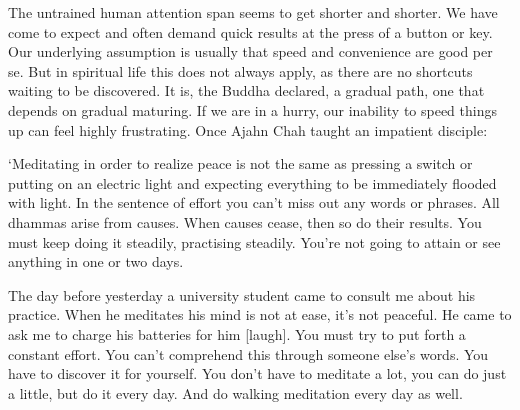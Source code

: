 The untrained human attention span seems to get shorter and shorter. We
have come to expect and often demand quick results at the press of a
button or key. Our underlying assumption is usually that speed and
convenience are good per se. But in spiritual life this does not always
apply, as there are no shortcuts waiting to be discovered. It is, the
Buddha declared, a gradual path, one that depends on gradual maturing. 
If we are in a hurry, our inability to speed things up can feel highly
frustrating. Once Ajahn Chah taught an impatient disciple: 

`Meditating in order to realize peace is not the same as pressing a
switch or putting on an electric light and expecting everything to be
immediately flooded with light. In the sentence of effort you can't miss
out any words or phrases. All dhammas arise from causes. When causes
cease, then so do their results. You must keep doing it steadily, 
practising steadily. You're not going to attain or see anything in one
or two days.

The day before yesterday a university student came to
consult me about his practice. When he meditates his mind is not at
ease, it's not peaceful. He came to ask me to charge his batteries for
him [laugh]. You must try to put forth a constant effort. You can't
comprehend this through someone else's words. You have to discover it
for yourself. You don't have to meditate a lot, you can do just a
little, but do it every day. And do walking meditation every day as
well. 


